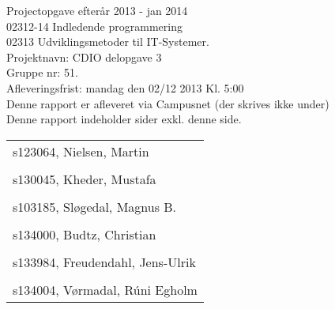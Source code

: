 \thispagestyle{empty}
\begin{titlepage}
\bfseries
\begin{flushleft}
Projectopgave efterår 2013 - jan 2014\\
02312-14 Indledende programmering\\
02313 Udviklingsmetoder til IT-Systemer.\\
Projektnavn: CDIO delopgave 3\\
Gruppe nr: 51.\\
Afleveringsfrist: mandag den 02/12 2013 Kl. 5:00\\
Denne rapport er afleveret via Campusnet (der skrives ikke under)\\
Denne rapport indeholder \pageref{LastPage} sider exkl. denne side.\\
\end{flushleft}
\vspace{5\baselineskip}
\begin{center}
\begin{tabular}{l}
s123064, Nielsen, Martin\\
\\
s130045, Kheder, Mustafa\\
\\
s103185, Sløgedal, Magnus B.\\
\\
s134000, Budtz, Christian\\
\\
s133984, Freudendahl, Jens-Ulrik\\
\\
s134004, Vørmadal, Rúni Egholm\\
\end{tabular}
\end{center}

\end{titlepage}

\newpage